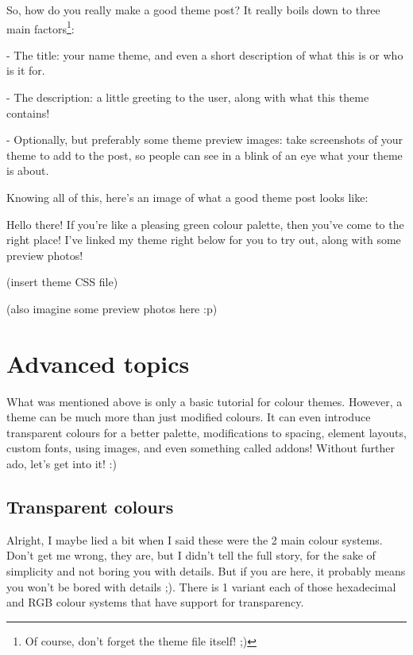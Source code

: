 \documentclass{article}
\begin{document}
So, how do you really make a good theme post? It really boils down to three main factors\footnote{Of course, don't forget the theme file itself! ;)}:

- The title: your name theme, and even a short description of what this is or who is it for.

- The description: a little greeting to the user, along with what this theme contains!

- Optionally, but preferably some theme preview images: take screenshots of your theme to add to the post, so people can see in a blink of an eye what your theme is about.

Knowing all of this, here's an image of what a good theme post looks like:
\begin{tcolorbox}[colback=green!5!white,colframe=green!75!black,title=Cheetah theme - a green theme perfect for nature enthusiastics!]
  Hello there! If you're like a pleasing green colour palette, then you've come to the right place! I've linked my theme right below for you to try out, along with some preview photos!

  (insert theme CSS file)

  (also imagine some preview photos here :p)
\end{tcolorbox}
\clearpage

\section{Advanced topics}

What was mentioned above is only a basic tutorial for colour themes. However, a theme can be much more than just modified colours. It can even introduce transparent colours for a better palette, modifications to spacing, element layouts, custom fonts, using images, and even something called addons!
Without further ado, let's get into it! :)

\subsection{Transparent colours}

Alright, I maybe lied a bit when I said these were the 2 main colour systems. Don't get me wrong, they are, but I didn't tell the full story, for the sake of simplicity and not boring you with details. But if you are here, it probably means you won't be bored with details ;).
There is 1 variant each of those hexadecimal and RGB colour systems that have support for transparency.
\end{document}
